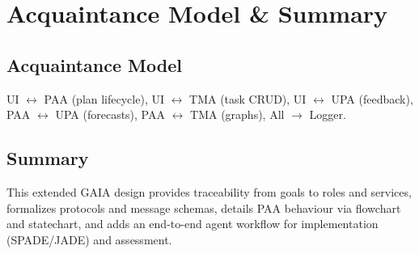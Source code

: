 \documentclass[12pt,oneside]{report}
\begin{document}
\chapter{Acquaintance Model \& Summary}
\section{Acquaintance Model}
UI $\leftrightarrow$ PAA (plan lifecycle), UI $\leftrightarrow$ TMA (task CRUD), UI $\leftrightarrow$ UPA (feedback), PAA $\leftrightarrow$ UPA (forecasts), PAA $\leftrightarrow$ TMA (graphs), All $\rightarrow$ Logger.

\section{Summary}
This extended GAIA design provides traceability from goals to roles and services, formalizes protocols and message schemas, details PAA behaviour via flowchart and statechart, and adds an end-to-end agent workflow for implementation (SPADE/JADE) and assessment.
\end{document}
